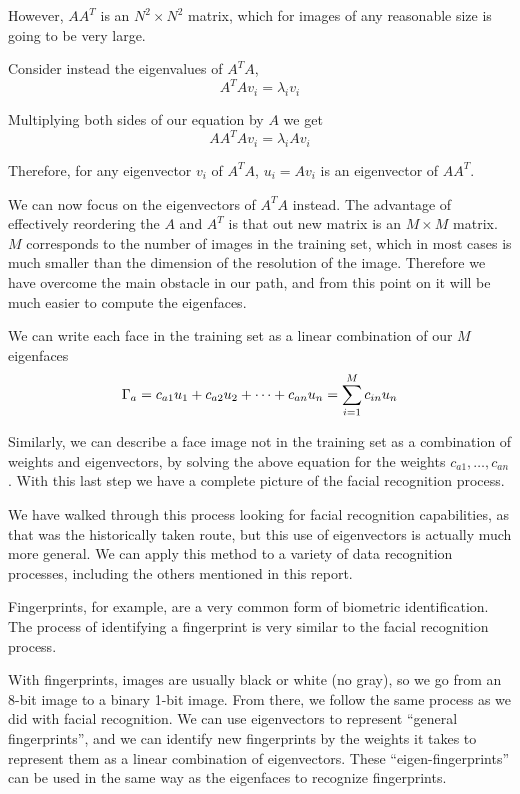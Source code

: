 \documentclass[12pt]{report}
\begin{document}
            However, $AA^T$ is an $N^2 \times N^2$ matrix, which for images of any reasonable size is going to be very large.

            Consider instead the eigenvalues of $A^T A$, 
                \[
                    A^TAv_{i} = \lambda_i v_i
                \]
            
            Multiplying both sides of our equation by $A$ we get
                \[
                    AA^TAv_{i} = \lambda_i Av_{i}
                \]

            Therefore, for any eigenvector $v_i$ of $A^TA$, $u_{i}=Av_{i}$ is an eigenvector of $AA^T$\cite{wiki:Eigenface}.
             
            We can now focus on the eigenvectors of $A^TA$ instead. The advantage of effectively reordering the $A$ and $A^T$ is that out new matrix is an $M \times M$ matrix. $M$ corresponds to the number of images in the training set, which in most cases is much smaller than the dimension of the resolution of the image. Therefore we have overcome the main obstacle in our path, and from this point on it will be much easier to compute the eigenfaces.
            
            We can write each face in the training set as a linear combination of our $M$ eigenfaces
                \[
                    \Gamma_a = c_{a1} u_1 + c_{a2} u_2 + \dots + c_{an} u_n \\
                     = \sum_{i=1}^M c_{in} u_n
                \] 

            Similarly, we can describe a face image not in the training set as a combination of weights and eigenvectors, by solving the above equation for the weights $c_{a1},\dots,c_{an}$. With this last step we have a complete picture of the facial recognition process.

            We have walked through this process looking for facial recognition capabilities, as that was the historically taken route, but this use of eigenvectors is actually much more general. We can apply this method to a variety of data recognition processes, including the others mentioned in this report.

            Fingerprints, for example, are a very common form of biometric identification. The process of identifying a fingerprint is very similar to the facial recognition process.
            
            With fingerprints, images are usually black or white (no gray), so we go from an 8-bit image to a binary 1-bit image. From there, we follow the same process as we did with facial recognition. We can use eigenvectors to represent ``general fingerprints'', and we can identify new fingerprints by the weights it takes to represent them as a linear combination of eigenvectors. These ``eigen-fingerprints'' can be used in the same way as the eigenfaces to recognize fingerprints.
\end{document}
